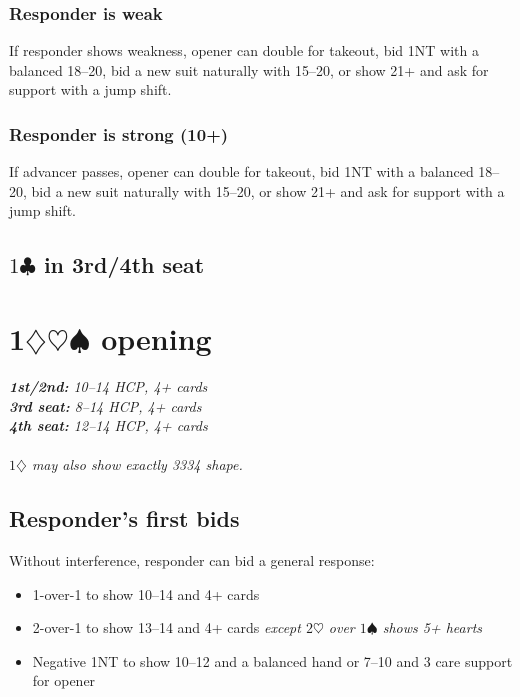 \documentclass[a4paper, twoside, 11pt]{article}
\begin{document}
\begin{multicols}{3}
\subsubsection*{Responder is weak}
If responder shows weakness, opener can double for takeout, bid \textnormal{1NT} with a balanced 18--20, bid a new suit naturally with 15--20, or show 21+ and ask for support with a jump shift.

\subsubsection*{Responder is strong (10+)}
If advancer passes, opener can double for takeout, bid \textnormal{1NT} with a balanced 18--20, bid a new suit naturally with 15--20, or show 21+ and ask for support with a jump shift.






 \subsection*{$1\clubsuit$ in 3rd/4th seat}





\section{1$\diamondsuit\heartsuit\spadesuit$ opening}


\emph{\textbf{1st/2nd:} 10--14 HCP, 4+ cards \\ \textbf{3rd seat:} 8--14 HCP, 4+ cards \\ \textbf{4th seat:} 12--14 HCP, 4+ cards \\ \\
$1\diamondsuit$ may also show exactly 3334 shape.}

\subsection*{Responder's first bids}

Without interference, responder can bid a general response:
\begin{itemize}
    \item 1-over-1 to show 10--14 and 4+ cards
    \item 2-over-1 to show 13--14 and 4+ cards \textit{except $2\heartsuit$ over $1\spadesuit$ shows 5+ hearts}
    \item Negative \textnormal{1NT} to show 10--12 and a balanced hand or 7--10 and 3 care support for opener
\end{itemize}


\end{multicols}
\end{document}
